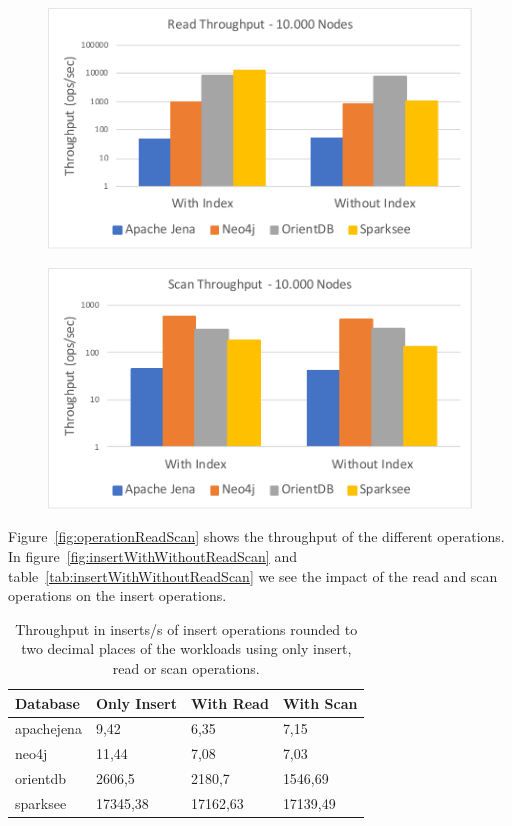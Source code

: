 \begin{figure}[h!]
  \centering
  \includegraphics[width=.75\textwidth]{images/responsiveness/readThroughput10000Nodes}
  \label{fig:readThroughput10000Nodes}
\end{figure}

\begin{figure}[h!]
  \centering
  \includegraphics[width=.75\textwidth]{images/responsiveness/scanThroughput10000Nodes}
  \label{fig:scanThroughput10000Nodes}
\end{figure}

Figure~\ref{fig:operationReadScan} shows the throughput of the different operations.
In figure~\ref{fig:insertWithWithoutReadScan} and table~\ref{tab:insertWithWithoutReadScan} we see the impact of the read and scan operations on the insert operations.

\begin{table}[h!]
  \begin{minipage}{\textwidth}
    \centering
    \begin{tabularx}{\textwidth}{ | l | X | X | X | }
      \hline
      Database & Only Insert & With Read & With Scan \\ \hline
      apachejena & 9,42 & 6,35 & 7,15 \\ \hline
      neo4j & 11,44 & 7,08 & 7,03 \\ \hline
      orientdb & 2606,5 & 2180,7 & 1546,69 \\ \hline
      sparksee & 17345,38 & 17162,63 & 17139,49 \\ \hline
    \end{tabularx}
  \end{minipage}
  \caption{Throughput in inserts/s of insert operations rounded to two decimal places of the workloads using only insert, read or scan operations.}
  \label{tab:scanThroughput10000Nodes}
\end{table}

